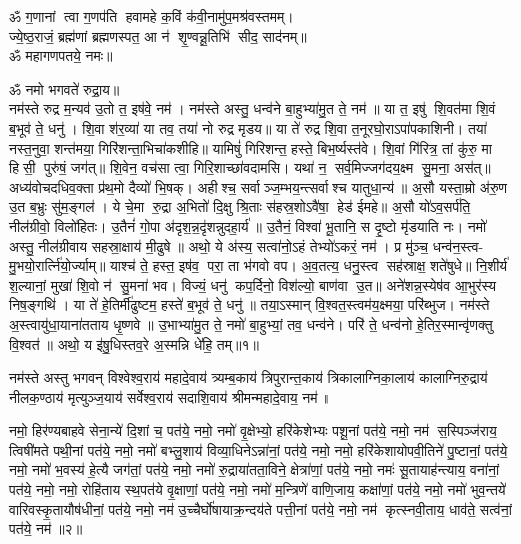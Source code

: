 
\newpage
{}

ॐ ग॒णानां त्वा ग॒णप॑ति हवामहे क॒विं क॑वी॒नामु॑प॒मश्र॑वस्तमम्। \\
ज्ये॒ष्ठ॒राजं॒ ब्रह्म॑णां ब्रह्मणस्पत॒ आ न॑ शृ॒ण्वन्नू॒तिभि॑ सीद॒ साद॑नम्॥ \\
ॐ महागणपतये॒ नमः॥ 

ॐ नमो भगवते॑ रुद्रा॒य॥\\
 नम॑स्ते रुद्र म॒न्यव॑ उ॒तो त॒ इष॑वे॒ नम॑। नम॑स्ते अस्तु॒ धन्व॑ने बा॒हुभ्या॑मु॒त ते॒ नम॑॥ या त॒ इषु॑ शि॒वत॑मा शि॒वं ब॒भूव॑ ते॒ धनु॑। शि॒वा श॑र॒व्या॑ या तव॒ तया॑ नो रुद्र मृडय॥ या ते॑ रुद्र शि॒वा त॒नूरघो॒राऽपा॑पकाशिनी। तया॑ नस्त॒नुवा॒ शन्त॑मया॒ गिरि॑शन्ता॒\-भिचा॑कशीहि॥ यामिषुं॑ गिरिशन्त॒ हस्ते॒ बिभ॒र्ष्यस्त॑वे। शि॒वां गि॑रित्र॒ तां कु॑रु॒ मा हिसी॒ पुरु॑षं॒ जग॑त्॥ शि॒वेन॒ वच॑सा त्वा॒ गिरि॒शाच्छा॑वदामसि। यथा॑ न॒ सर्व॒मिज्जग॑दय॒क्ष्म सु॒मना॒ अस॑त्॥ अध्य॑वोचदधिव॒क्ता प्र॑थ॒मो दैव्यो॑ भि॒षक्।  अहीश्च॒ सर्वाञ्ज॒म्भय॒न्त्सर्वाश्च यातुधा॒न्य॑॥ अ॒सौ यस्ता॒म्रो अ॑रु॒ण उ॒त ब॒भ्रुः सु॑म॒ङ्गल॑। ये चे॒मा रु॒द्रा अ॒भितो॑ दि॒क्षु श्रि॒ताः स॑हस्र॒शोऽवै॑षा॒ हेड॑ ईमहे॥ अ॒सौ यो॑ऽव॒सर्प॑ति॒ नील॑ग्रीवो॒ विलो॑हितः। उ॒तैनं॑ गो॒पा अ॑दृश॒न्न॒दृ॑शन्नुदहा॒र्य॑॥ उ॒तैनं॒ विश्वा॑ भू॒तानि॒ स दृ॒ष्टो मृ॑डयाति नः। नमो॑ अस्तु॒ नील॑ग्रीवाय सहस्रा॒क्षाय॑ मी॒ढुषे॥ अथो॒ ये अ॑स्य॒ सत्वा॑नो॒ऽहं तेभ्यो॑ऽकरं॒ नम॑। प्र मु॑ञ्च॒ धन्व॑न॒स्त्व-मु॒भयो॒रार्त्नि॑यो॒र्ज्याम्॥ याश्च॑ ते॒ हस्त॒ इष॑व॒ परा॒ ता भ॑गवो वप। अ॒व॒तत्य॒ धनु॒स्त्व सह॑स्राक्ष॒ शते॑षुधे॥ नि॒शीर्य॑ श॒ल्यानां॒ मुखा॑ शि॒वो न॑ सु॒मना॑ भव। विज्यं॒ धनु॑ कप॒र्दिनो॒ विश॑ल्यो॒ बाण॑वा उ॒त॥
 अने॑शन्न॒\-स्येष॑व आ॒भुर॑स्य निष॒ङ्गथि॑। या ते॑ हे॒तिर्मी॑ढुष्टम॒ हस्ते॑ ब॒भूव॑ ते॒ धनु॑॥ तया॒ऽस्मान् वि॒श्वत॒स्त्वम॑य॒क्ष्मया॒ परि॑ब्भुज। नम॑स्ते अ॒स्त्वायु॑धा॒याना॑तताय धृ॒ष्णवे॥ उ॒भाभ्या॑मु॒त ते॒ नमो॑ बा॒हुभ्यां॒ तव॒ धन्व॑ने। परि॑ ते॒ धन्व॑नो हे॒तिर॒स्मान्वृ॑णक्तु वि॒श्वत॑॥ अथो॒ य इ॑षु॒धिस्तव॒\aav{}\aav{}रे अ॒स्मन्नि धे॑हि॒ तम्॥१॥

 
नम॑स्ते अस्तु भगवन् विश्वेश्व॒राय॑ महादे॒वाय॑ त्र्यम्ब॒काय॑ त्रिपुरान्त॒काय॑ त्रिकालाग्निका॒लाय॑ कालाग्निरु॒द्राय॑ नीलक॒ण्ठाय॑ मृत्युञ्ज॒याय॑ सर्वेश्व॒राय॑ सदाशि॒वाय॑ श्रीमन्महादे॒वाय॒ नम॑॥ 

नमो॒ हिर॑ण्यबाहवे सेना॒न्ये॑ दि॒शां च॒ पत॑ये॒ नमो॒ नमो॑ वृ॒क्षेभ्यो॒ हरि॑केशेभ्यः पशू॒नां पत॑ये॒ नमो॒ नम॑ स॒स्पिञ्ज॑राय॒ त्विषी॑मते पथी॒नां पत॑ये॒ नमो॒ नमो॑ बभ्लु॒शाय॑ विव्या॒धिने\-ऽन्ना॑नां॒ पत॑ये॒ नमो॒ नमो॒ हरि॑केशायोपवी॒तिने॑ पु॒ष्टानां॒ पत॑ये॒ नमो॒ नमो॑ भ॒वस्य॑ हे॒त्यै जग॑तां॒ पत॑ये॒ नमो॒ नमो॑ रु॒द्राया॑तता॒विने॒ क्षेत्रा॑णां॒ पत॑ये॒ नमो॒ नमः॑ सू॒तायाह॑न्त्याय॒ वना॑नां॒ पत॑ये॒ नमो॒ नमो॒ रोहि॑ताय स्थ॒पत॑ये वृ॒क्षाणां॒ पत॑ये॒ नमो॒ नमो॑ म॒न्त्रिणे॑ वाणि॒जाय॒ कक्षा॑णां॒ पत॑ये॒ नमो॒ नमो॑ भुव॒न्तये॑ वारिवस्कृ॒तायौष॑धीनां॒ पत॑ये॒ नमो॒ नम॑ उ॒च्चैर्घो॑षा\-याक्र॒न्दय॑ते पत्ती॒नां पत॑ये॒ नमो॒ नम॑ कृत्स्नवी॒ताय॒ धाव॑ते॒ सत्व॑नां॒ पत॑ये॒ नम॑॥२॥ 

